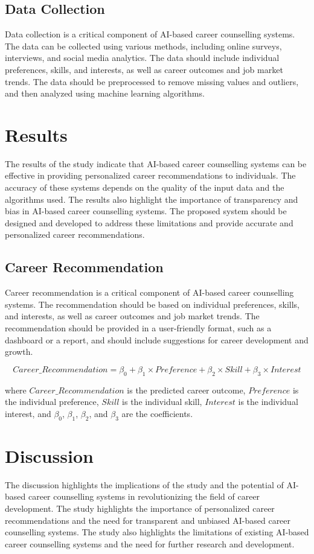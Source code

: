 \documentclass[12pt,a4paper]{article}
\begin{document}
\subsection{Data Collection}
Data collection is a critical component of AI-based career counselling systems. The data can be collected using various methods, including online surveys, interviews, and social media analytics. The data should include individual preferences, skills, and interests, as well as career outcomes and job market trends. The data should be preprocessed to remove missing values and outliers, and then analyzed using machine learning algorithms.

\section{Results}
The results of the study indicate that AI-based career counselling systems can be effective in providing personalized career recommendations to individuals. The accuracy of these systems depends on the quality of the input data and the algorithms used. The results also highlight the importance of transparency and bias in AI-based career counselling systems. The proposed system should be designed and developed to address these limitations and provide accurate and personalized career recommendations.

\subsection{Career Recommendation}
Career recommendation is a critical component of AI-based career counselling systems. The recommendation should be based on individual preferences, skills, and interests, as well as career outcomes and job market trends. The recommendation should be provided in a user-friendly format, such as a dashboard or a report, and should include suggestions for career development and growth.

\begin{equation}
Career\_Recommendation = \beta_0 + \beta_1 \times Preference + \beta_2 \times Skill + \beta_3 \times Interest
\end{equation}

where $Career\_Recommendation$ is the predicted career outcome, $Preference$ is the individual preference, $Skill$ is the individual skill, $Interest$ is the individual interest, and $\beta_0$, $\beta_1$, $\beta_2$, and $\beta_3$ are the coefficients.

\section{Discussion}
The discussion highlights the implications of the study and the potential of AI-based career counselling systems in revolutionizing the field of career development. The study highlights the importance of personalized career recommendations and the need for transparent and unbiased AI-based career counselling systems. The study also highlights the limitations of existing AI-based career counselling systems and the need for further research and development.
\end{document}
